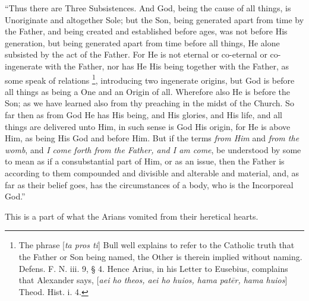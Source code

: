 ``Thus there are Three
Subsistences. And God, being the cause of all things, is Unoriginate
and altogether Sole; but the Son, being generated apart from time by
the Father, and being created and established before ages, was not
before His generation, but being generated apart from time before all
things, He alone subsisted by the act of the Father. For He is not
eternal or co-eternal or co-ingenerate with the Father, nor has He His
being together with the Father, as some speak of relations \footnote{The phrase [\emph{ta pros ti}] Bull well explains to refer to the
Catholic truth that the Father or Son being named, the Other is
therein implied without naming. Defens. F. N. iii. 9, § 4. Hence
Arius, in his Letter to Eusebius, complains that Alexander says, [\emph{aei
ho theos, aei ho huios, hama pat\={e}r, hama huios}] Theod. Hist.
i. 4.}, introducing two ingenerate origins, but God is before all
things as being a One and an Origin of all. Wherefore also He is
before the Son; as we have learned also from thy preaching in the
midst of the Church. So far then as from God He has His being, and His
glories, and His life, and all things are delivered unto Him, in such
sense is God His origin, for He is above Him, as being His God and
before Him. But if the terms \emph{from Him} and \emph{from the womb},
and \emph{I come forth from the Father, and I am come}, be understood
by some to mean as if a consubstantial part of Him, or as an issue,
then the Father is according to them compounded and divisible and
alterable and material, and, as far as their belief goes, has the
circumstances of a body, who is the Incorporeal God.''

This is a part of what the
Arians vomited from their heretical hearts.

